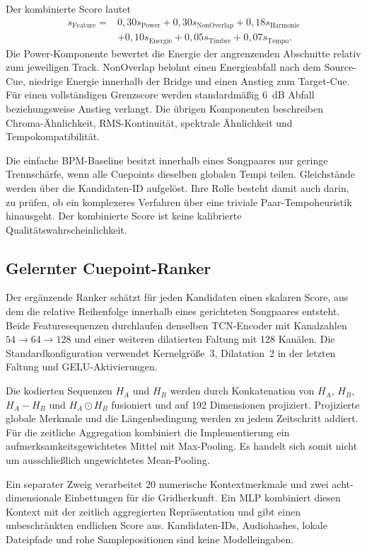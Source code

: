 Der kombinierte Score lautet
\begin{align}
 s_{\mathrm{Feature}}={}&
 0{,}30s_{\mathrm{Power}}+0{,}30s_{\mathrm{NonOverlap}}
 +0{,}18s_{\mathrm{Harmonie}}\nonumber\\
 &+0{,}10s_{\mathrm{Energie}}+0{,}05s_{\mathrm{Timbre}}
 +0{,}07s_{\mathrm{Tempo}}.
\end{align}
Die Power-Komponente bewertet die Energie der angrenzenden Abschnitte relativ zum jeweiligen Track. NonOverlap belohnt einen Energieabfall nach dem Source-Cue, niedrige Energie innerhalb der Bridge und einen Anstieg zum Target-Cue. Für einen vollständigen Grenzscore werden standardmäßig 6~dB Abfall beziehungsweise Anstieg verlangt. Die übrigen Komponenten beschreiben Chroma-Ähnlichkeit, RMS-Kontinuität, spektrale Ähnlichkeit und Tempokompatibilität.

Die einfache BPM-Baseline besitzt innerhalb eines Songpaares nur geringe Trennschärfe, wenn alle Cuepoints dieselben globalen Tempi teilen. Gleichstände werden über die Kandidaten-ID aufgelöst. Ihre Rolle besteht damit auch darin, zu prüfen, ob ein komplexeres Verfahren über eine triviale Paar-Tempoheuristik hinausgeht. Der kombinierte Score ist keine kalibrierte Qualitätswahrscheinlichkeit.

\subsection{Gelernter Cuepoint-Ranker}
\label{sec:methodik-ranker}

Der ergänzende Ranker schätzt für jeden Kandidaten einen skalaren Score, aus dem die relative Reihenfolge innerhalb eines gerichteten Songpaares entsteht. Beide Featuresequenzen durchlaufen denselben TCN-Encoder mit Kanalzahlen $54\rightarrow64\rightarrow128$ und einer weiteren dilatierten Faltung mit 128 Kanälen. Die Standardkonfiguration verwendet Kernelgröße~3, Dilatation~2 in der letzten Faltung und GELU-Aktivierungen.

Die kodierten Sequenzen $H_A$ und $H_B$ werden durch Konkatenation von $H_A$, $H_B$, $H_A-H_B$ und $H_A\odot H_B$ fusioniert und auf 192 Dimensionen projiziert. Projizierte globale Merkmale und die Längenbedingung werden zu jedem Zeitschritt addiert. Für die zeitliche Aggregation kombiniert die Implementierung ein aufmerksamkeitsgewichtetes Mittel mit Max-Pooling. Es handelt sich somit nicht um ausschließlich ungewichtetes Mean-Pooling.

Ein separater Zweig verarbeitet 20 numerische Kontextmerkmale und zwei acht-dimensionale Einbettungen für die Gridherkunft. Ein MLP kombiniert diesen Kontext mit der zeitlich aggregierten Repräsentation und gibt einen unbeschränkten endlichen Score aus. Kandidaten-IDs, Audiohashes, lokale Dateipfade und rohe Samplepositionen sind keine Modelleingaben.

